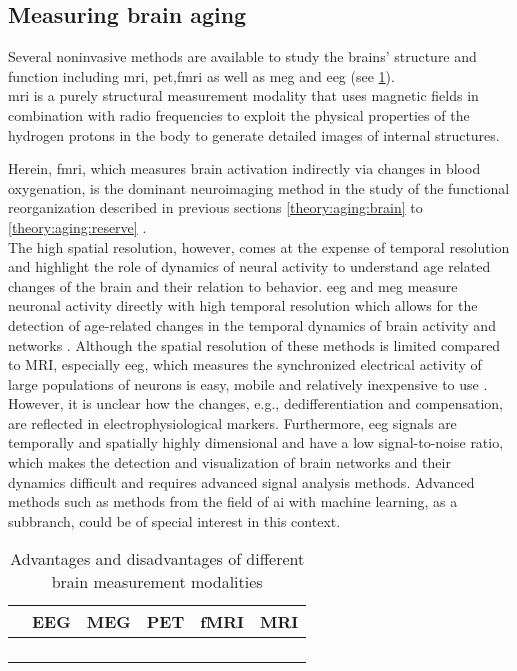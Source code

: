 \subsection{Measuring brain aging}
Several noninvasive methods are available to study the brains' structure and function including \gls{mri}, \gls{pet},\gls{fmri} as well as \gls{meg} and \gls{eeg} (see \ref{tab:methods}).\\
\Gls{mri} is a purely structural measurement modality that uses magnetic fields in combination with radio frequencies to exploit the physical properties of the hydrogen protons in the body to generate detailed images of internal structures.


Herein, \Gls{fmri}, which measures brain activation indirectly via changes in blood oxygenation, is the dominant neuroimaging method in the study of the functional reorganization described in previous sections \ref{theory:aging:brain} to \ref{theory:aging:reserve} \cite{Reuter-Lorenz2010}.\\
The high spatial resolution, however, comes at the expense of temporal resolution and \citeauthor{Courtney2021} \cite{Courtney2021} highlight the role of dynamics of neural activity to understand age related changes of the brain and their relation to behavior. \Gls{eeg} and \gls{meg} measure neuronal activity directly with high temporal resolution which allows for the detection of age-related changes in the temporal dynamics of brain activity and networks \cite{Courtney2021}. Although the spatial resolution of these methods is limited compared to MRI, especially \gls{eeg}, which measures the synchronized electrical activity of large populations of neurons is easy, mobile and relatively inexpensive to use \cite{CohenX2017}. However, it is unclear how the changes, e.g., dedifferentiation and compensation, are reflected in electrophysiological markers. Furthermore, \gls{eeg} signals are temporally and spatially highly dimensional and have a low signal-to-noise ratio, which makes the detection and visualization of brain networks and their dynamics difficult and requires advanced signal analysis methods. Advanced methods such as methods from the field of \gls{ai} with machine learning, as a subbranch, could be of special interest in this context.\\
\begin{table}
    \label{tab:methods}
    \centering
    \begin{tabular}{|c|c|c|c|c|c|}
        \hline
             & EEG & MEG & PET & fMRI & MRI \\
        \hline
         &  &  &  &  & \\
        \hline
         &  &  &  &  & \\
        \hline
         &  &  &  &  & \\
        \hline
         &  &  &  &  & \\
        \hline
    \end{tabular}
    \caption{Advantages and disadvantages of different brain measurement modalities}
\end{table}
